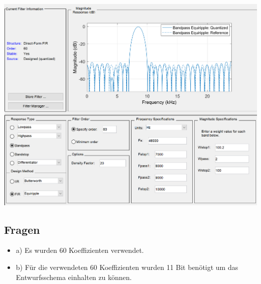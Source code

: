 \includegraphics[scale=0.8]{../plot4_4.png}

\subsection{Fragen}

\begin{itemize}
\item{a)} Es wurden 60 Koeffizienten verwendet.
\item{b)} Für die verwendeten 60 Koeffizienten wurden 11 Bit benötigt um das Entwurfsschema einhalten zu können.
\end{itemize}

\newpage


